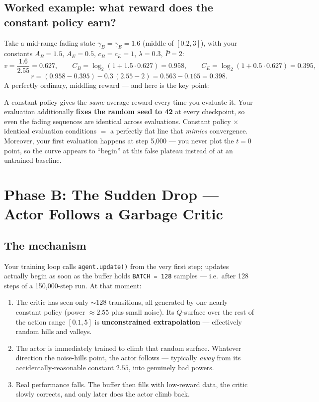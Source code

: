 \documentclass[11pt]{article}
\begin{document}
\subsection{Worked example: what reward does the constant policy earn?}

Take a mid-range fading state $\gamma_B=\gamma_E=1.6$ (middle of $[0.2,3]$), with your
constants $A_B=1.5$, $A_E=0.5$, $c_B=c_E=1$, $\lambda=0.3$, $\bar P=2$:
\[
v = \frac{1.6}{2.55}=0.627,\qquad
C_B=\log_2(1+1.5\cdot0.627)=0.958,\qquad
C_E=\log_2(1+0.5\cdot0.627)=0.395,
\]
\[
r = (0.958-0.395) - 0.3\,(2.55-2) = 0.563 - 0.165 = 0.398 .
\]
A perfectly ordinary, middling reward --- and here is the key point:

\begin{warnbox}
A constant policy gives the \emph{same} average reward every time you evaluate it.
Your evaluation additionally \textbf{fixes the random seed to 42} at every
checkpoint, so even the fading sequences are identical across evaluations. Constant
policy $\times$ identical evaluation conditions $=$ a perfectly flat line that
\emph{mimics} convergence. Moreover, your first evaluation happens at step 5{,}000
--- you never plot the $t=0$ point, so the curve appears to ``begin'' at this false
plateau instead of at an untrained baseline.
\end{warnbox}

\section{Phase B: The Sudden Drop --- Actor Follows a Garbage Critic}

\subsection{The mechanism}

Your training loop calls \texttt{agent.update()} from the very first step; updates
actually begin as soon as the buffer holds \texttt{BATCH = 128} samples --- i.e.\
after 128 steps of a 150{,}000-step run. At that moment:

\begin{enumerate}
\item The critic has seen only $\sim$128 transitions, all generated by one nearly
      constant policy (power $\approx 2.55$ plus small noise). Its $Q$-surface over
      the rest of the action range $[0.1, 5]$ is \textbf{unconstrained
      extrapolation} --- effectively random hills and valleys.
\item The actor is immediately trained to climb that random surface. Whatever
      direction the noise-hills point, the actor follows --- typically \emph{away}
      from its accidentally-reasonable constant $2.55$, into genuinely bad powers.
\item Real performance falls. The buffer then fills with low-reward data, the critic
      slowly corrects, and only later does the actor climb back.
\end{enumerate}
\end{document}
